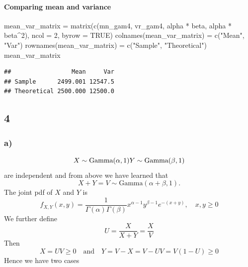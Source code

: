 \documentclass[
]{article}
\newenvironment{Shaded}{\begin{snugshade}}{\end{snugshade}}
\newcommand{\AttributeTok}[1]{\textcolor[rgb]{0.77,0.63,0.00}{#1}}
\newcommand{\ConstantTok}[1]{\textcolor[rgb]{0.00,0.00,0.00}{#1}}
\newcommand{\DecValTok}[1]{\textcolor[rgb]{0.00,0.00,0.81}{#1}}
\newcommand{\FunctionTok}[1]{\textcolor[rgb]{0.00,0.00,0.00}{#1}}
\newcommand{\NormalTok}[1]{#1}
\newcommand{\OtherTok}[1]{\textcolor[rgb]{0.56,0.35,0.01}{#1}}
\newcommand{\SpecialCharTok}[1]{\textcolor[rgb]{0.00,0.00,0.00}{#1}}
\newcommand{\StringTok}[1]{\textcolor[rgb]{0.31,0.60,0.02}{#1}}
\begin{document}
\hypertarget{comparing-mean-and-variance}{%
\paragraph{Comparing mean and
variance}\label{comparing-mean-and-variance}}

\begin{Shaded}
\begin{Highlighting}[]
\NormalTok{mean\_var\_matrix }\OtherTok{=} \FunctionTok{matrix}\NormalTok{(}\FunctionTok{c}\NormalTok{(mn\_gam4, vr\_gam4, alpha }\SpecialCharTok{*}\NormalTok{ beta, alpha }\SpecialCharTok{*}\NormalTok{ beta}\SpecialCharTok{\^{}}\DecValTok{2}\NormalTok{), }\AttributeTok{ncol =} \DecValTok{2}\NormalTok{, }
    \AttributeTok{byrow =} \ConstantTok{TRUE}\NormalTok{)}
\FunctionTok{colnames}\NormalTok{(mean\_var\_matrix) }\OtherTok{=} \FunctionTok{c}\NormalTok{(}\StringTok{"Mean"}\NormalTok{, }\StringTok{"Var"}\NormalTok{)}
\FunctionTok{rownames}\NormalTok{(mean\_var\_matrix) }\OtherTok{=} \FunctionTok{c}\NormalTok{(}\StringTok{"Sample"}\NormalTok{, }\StringTok{"Theoretical"}\NormalTok{)}
\NormalTok{mean\_var\_matrix}
\end{Highlighting}
\end{Shaded}

\begin{verbatim}
##                 Mean     Var
## Sample      2499.001 12547.5
## Theoretical 2500.000 12500.0
\end{verbatim}

\hypertarget{section-5}{%
\subsection{4}\label{section-5}}

\hypertarget{a-2}{%
\subsubsection{a)}\label{a-2}}

\[
X \sim \text{Gamma}(\alpha, 1) \\
Y \sim \text{Gamma}(\beta, 1)
\] are independent and from above we have learned that \[
X+Y = V \sim \text{Gamma}(\alpha + \beta, 1).
\] The joint pdf of \(X\) and \(Y\) is \[
f_{X, Y}(x, y) = \frac{1}{\Gamma(\alpha)\Gamma(\beta)}x^{\alpha-1}y^{\beta-1}e^{-(x+y)}, \quad x,y ≥ 0
\] We further define \[
U = \frac{X}{X + Y} = \frac{X}{V}
\] Then \[
X = UV ≥0 \quad \text{and} \quad Y = V-X = V-UV = V(1-U) ≥0
\] Hence we have two cases
\end{document}
